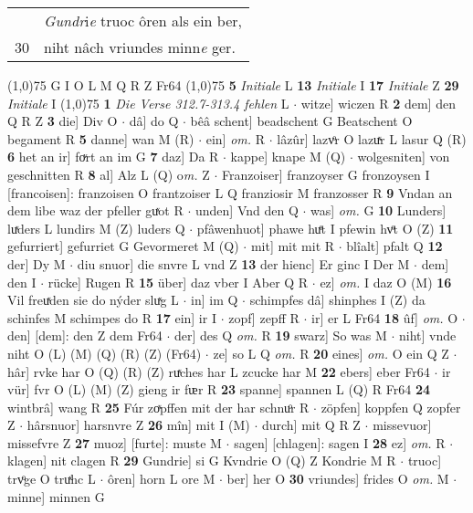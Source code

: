 \documentclass[8pt,a4paper,notitlepage]{article}
\begin{document}
\begin{table}[ht]
\begin{minipage}[t]{0.5\linewidth}
\begin{tabular}{rl}
 & \textit{Gundr}i\textit{e} truoc ôren als ein ber,\\ 
30 & niht nâch vriundes minn\textit{e} ger.\\ 
\end{tabular}
\scriptsize
\line(1,0){75} \newline
G I O L M Q R Z Fr64 \newline
\line(1,0){75} \newline
\textbf{5} \textit{Initiale} L  \textbf{13} \textit{Initiale} I  \textbf{17} \textit{Initiale} Z  \textbf{29} \textit{Initiale} I  \newline
\line(1,0){75} \newline
\textbf{1} \textit{Die Verse 312.7-313.4 fehlen} L   $\cdot$ witze] wiczen R \textbf{2} dem] den Q R Z \textbf{3} die] Div O  $\cdot$ dâ] do Q  $\cdot$ bêâ schent] beadschent G Beatschent O begament R \textbf{5} danne] wan M (R)  $\cdot$ ein] \textit{om.} R  $\cdot$ lâzûr] lazvͦr O lazuͯr L lasur Q (R) \textbf{6} het an ir] foͮrt an im G \textbf{7} daz] Da R  $\cdot$ kappe] knape M (Q)  $\cdot$ wolgesniten] von geschnitten R \textbf{8} al] Alz L (Q) o\textit{m. } Z  $\cdot$ Franzoiser] franzoyser G fronzoysen I [francoisen]: franzoisen O frantzoiser L Q franziosir M franzosser R \textbf{9} Vndan an dem libe waz der pfeller guͯot R  $\cdot$ unden] Vnd den Q  $\cdot$ was] \textit{om.} G \textbf{10} Lunders] luͯders L lundirs M (Z) luders Q  $\cdot$ pfâwenhuot] phawe huͤt I pfewin hvͦt O (Z) \textbf{11} gefurriert] gefurriet G Gevormeret M (Q)  $\cdot$ mit] mit mit R  $\cdot$ blîalt] pfalt Q \textbf{12} der] Dy M  $\cdot$ diu snuor] die snvre L vnd Z \textbf{13} der hienc] Er ginc I Der M  $\cdot$ dem] den I  $\cdot$ rücke] Rugen R \textbf{15} über] daz vber I Aber Q R  $\cdot$ ez] \textit{om.} I daz O (M) \textbf{16} Vil freuͯden sie do nýder sluͯg L  $\cdot$ in] im Q  $\cdot$ schimpfes dâ] shinphes I (Z) da schinfes M schimpes do R \textbf{17} ein] ir I  $\cdot$ zopf] zepff R  $\cdot$ ir] er L Fr64 \textbf{18} ûf] \textit{om.} O  $\cdot$ den] [dem]: den Z dem Fr64  $\cdot$ der] des Q \textit{om.} R \textbf{19} swarz] So was M  $\cdot$ niht] vnde niht O (L) (M) (Q) (R) (Z) (Fr64)  $\cdot$ ze] so L Q \textit{om.} R \textbf{20} eines] \textit{om.} O ein Q Z  $\cdot$ hâr] rvke har O (Q) (R) (Z) ruͯches har L zcucke har M \textbf{22} ebers] eber Fr64  $\cdot$ ir vür] fvr O (L) (M) (Z) gieng ir fᵫr R \textbf{23} spanne] spannen L (Q) R Fr64 \textbf{24} wintbrâ] wang R \textbf{25} Fúr zoͯpffen mit der har schnuͦr R  $\cdot$ zöpfen] koppfen Q zopfer Z  $\cdot$ hârsnuor] harsnvre Z \textbf{26} mîn] mit I (M)  $\cdot$ durch] mit Q R Z  $\cdot$ missevuor] missefvre Z \textbf{27} muoz] [furte]: muste M  $\cdot$ sagen] [chlagen]: sagen I \textbf{28} ez] \textit{om.} R  $\cdot$ klagen] nit clagen R \textbf{29} Gundrie] si G Kvndrie O (Q) Z Kondrie M R  $\cdot$ truoc] trvͦge O truͯhc L  $\cdot$ ôren] horn L ore M  $\cdot$ ber] her O \textbf{30} vriundes] frides O \textit{om.} M  $\cdot$ minne] minnen G \newline

\end{minipage}
\end{table}
\end{document}
